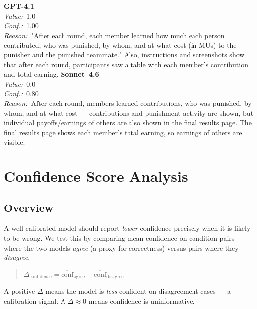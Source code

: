 \documentclass[11pt,a4paper]{article}
\begin{document}
\begin{tcolorbox}[
  title={\textbf{CONFIG\_showOtherSummaries} \textbar{} DOI: 10.1177\_0190272517703750 \textbar{} Cond.~0},
  colback=blue!3!white,
  colframe=blue!45!black,
  fonttitle=\small\sffamily,
  sidebyside,
  sidebyside align=top seam,
  lower separated=false,
  breakable,
  before upper={\small},
  before lower={\small},
]
\textbf{GPT-4.1}\\[2pt]
\textit{Value:}~1.0\\[3pt]
\textit{Conf.:}~1.00\\[3pt]
\textit{Reason:}~"After each round, each member learned how much each person contributed, who was punished, by whom, and at what cost (in MUs) to the punisher and the punished teammate." Also, instructions and screenshots show that after each round, participants saw a table with each member's contribution and total earning.
\tcblower
\textbf{Sonnet~4.6}\\[2pt]
\textit{Value:}~0.0\\[3pt]
\textit{Conf.:}~0.80\\[3pt]
\textit{Reason:}~After each round, members learned contributions, who was punished, by whom, and at what cost --- contributions and punishment activity are shown, but individual payoffs/earnings of others are also shown in the final results page. The final results page shows each member's total earning, so earnings of others are visible.
\end{tcolorbox}



\section{Confidence Score Analysis}
\subsection{Overview}

A well-calibrated model should report {\em lower} confidence precisely when it
is likely to be wrong.  We test this by comparing mean confidence on condition
pairs where the two models {\em agree} (a proxy for correctness) versus pairs
where they {\em disagree}.

\begin{quote}
$\Delta_{\mathrm{confidence}} = \overline{\mathrm{conf}}_{\mathrm{agree}}
 - \overline{\mathrm{conf}}_{\mathrm{disagree}}$
\end{quote}

A positive $\Delta$ means the model is \emph{less} confident on disagreement
cases --- a calibration signal.  A $\Delta \approx 0$ means confidence is
uninformative.
\end{document}
